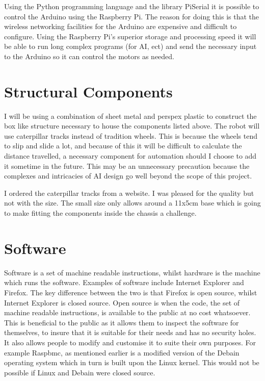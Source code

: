 \documentclass[]{report}   %
\begin{document}
				Using the Python programming language and the library PiSerial it is possible to control the Arduino using the Raspberry Pi. The reason
				for doing this is that the wireless networking facilities for the Arduino are expensive and difficult to configure. Using the Raspberry
				Pi's superior storage and processing speed it will be able to run long complex programs (for AI, ect) and send the necessary input to
				the Arduino so it can control the motors as needed.
			
			\section{Structural Components}
				I will be using a combination of sheet metal and perspex plastic to construct the box like structure necessary to house the components
				listed above. The robot will use caterpillar tracks instead of tradition wheels. This is because the wheels tend to slip and slide a lot,
				and because of this it will be difficult to calculate the distance travelled, a necessary component for automation should I choose to add
				it sometime in the future. This may be an unnecessary precaution because the complexes and intricacies of AI design go well beyond the
				scope of this project.
				
				I ordered the caterpillar tracks from a website. I was pleased for the quality but not with the size. The small size only allows around a 11x5cm
				base which is going to make fitting the components inside the chassis a challenge.
			
			\section{Software}
				Software is a set of machine readable instructions, whilst hardware is the machine which runs the software. Examples of software include
				Internet Explorer and Firefox. The key difference between the two is that Firefox is open source, whilst Internet Explorer is closed source.
				Open source is when the code, the set of machine readable instructions, is available to the public at no cost whatsoever. This is beneficial
				to the public as it allows them to inspect the software for themselves, to insure that it is suitable for their needs and has no security
				holes. It also allows people to modify and customise it to suite their own purposes. For example Raspbmc, as mentioned earlier is a modified
				version of the Debain operating system which in turn is built upon the Linux kernel. This would not be possible if Linux and Debain were closed
				source.
				
\end{document}
